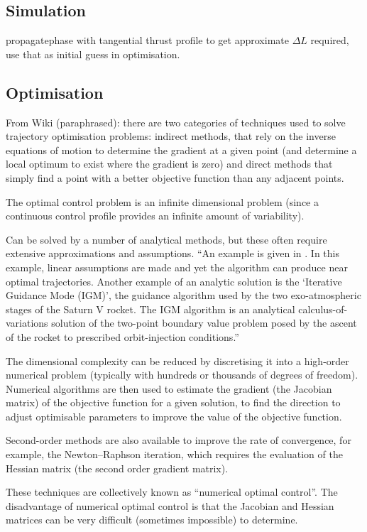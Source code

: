 \subsection{Simulation}
propagatephase with tangential thrust profile to get approximate $\Delta L$ required, use that as initial guess in optimisation.

\subsection{Optimisation}
From Wiki (paraphrased):
there are two categories of techniques used to solve trajectory optimisation problems: indirect methods, that rely on the inverse equations of motion to determine the gradient at a given point (and determine a local optimum to exist where the gradient is zero) and direct methods that simply find a point with a better objective function than any adjacent points.

The optimal control problem is an infinite dimensional problem (since a continuous control profile provides an infinite amount of variability). 

Can be solved by a number of analytical methods, but these often require extensive approximations and assumptions.
\enquote{An example is given in \textcite{Ohlmeyer2006}. In this example, linear assumptions are made and yet the algorithm can produce near optimal trajectories. Another example of an analytic solution is the \enquote{Iterative Guidance Mode (IGM)}, the guidance algorithm used by the two exo-atmospheric stages of the Saturn V rocket. The IGM algorithm is an analytical calculus-of-variations solution of the two-point boundary value problem posed by the ascent of the rocket to prescribed orbit-injection conditions.}

The dimensional complexity can be reduced by discretising it into a high-order numerical problem (typically with hundreds or thousands of degrees of freedom). Numerical algorithms are then used to estimate the gradient (the Jacobian matrix) of the objective function for a given solution, to find the direction to adjust optimisable parameters to improve the value of the objective function.

Second-order methods are also available to improve the rate of convergence, for example, the Newton–Raphson iteration, which requires the evaluation of the Hessian matrix (the second order gradient matrix). 

These techniques are collectively known as \enquote{numerical optimal control}. The disadvantage of numerical optimal control is that the Jacobian and Hessian matrices can be very difficult (sometimes impossible) to determine.


